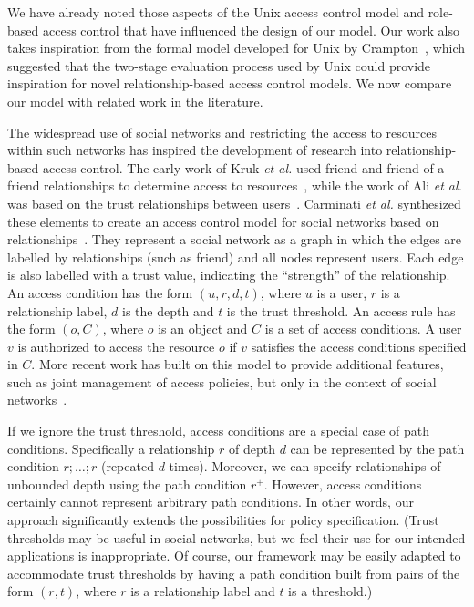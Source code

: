 \documentclass{article}
\newcommand{\comp}{\mathbin{;}}
\begin{document}
We have already noted those aspects of the Unix access control model and role-based access control that have influenced the design of our model.
Our work also takes inspiration from the formal model developed for Unix by Crampton~\cite{Crampton_UnixAccessControl}, which suggested that the two-stage evaluation process used by Unix could provide inspiration for novel relationship-based access control models.
We now compare our model with related work in the literature.



The widespread use of social networks and restricting the access to resources within such networks has inspired the development of research into relationship-based access control.
The early work of Kruk {\em et al.} used {\sf friend} and {\sf friend-of-a-friend} relationships to determine access to resources~\cite{KrGrGzWoCh06}, while the work of Ali {\em et al.} was based on the trust relationships between users~\cite{AlViMa07}.
Carminati {\em et al.} synthesized these elements to create an access control model for social networks based on relationships~\cite{Carminati_Enforcing}.
They represent a social network as a graph in which the edges are labelled by relationships (such as {\sf friend}) and all nodes represent users.
Each edge is also labelled with a trust value, indicating the ``strength'' of the relationship.
An access condition has the form $(u,r,d,t)$, where $u$ is a user, $r$ is a relationship label, $d$ is the depth and $t$ is the trust threshold.
An access rule has the form $(o,C)$, where $o$ is an object and $C$ is a set of access conditions.
A user $v$ is authorized to access the resource $o$ if $v$ satisfies the access conditions specified in $C$.
More recent work has built on this model to provide additional features, such as joint management of access policies, but only in the context of social networks~\cite{HuAhJo13}.

If we ignore the trust threshold, access conditions are a special case of path conditions.
Specifically a relationship $r$ of depth $d$ can be represented by the path condition $r \comp \dots \comp r$ (repeated $d$ times).
Moreover, we can specify relationships of unbounded depth using the path condition $r^+$.
However, access conditions certainly cannot represent arbitrary path conditions.
In other words, our approach significantly extends the possibilities for policy specification.
(Trust thresholds may be useful in social networks, but we feel their use for our intended applications is inappropriate.
Of course, our framework may be easily adapted to accommodate trust thresholds by having a path condition built from pairs of the form $(r,t)$, where $r$ is a relationship label and $t$ is a threshold.)
\end{document}

